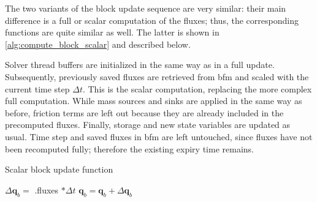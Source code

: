 
The two variants of the block update sequence are very similar: their main difference is a full or scalar computation of the fluxes; thus, the corresponding functions are quite similar as well. The latter is shown in \autoref{alg:compute_block_scalar} and described below.

Solver thread buffers are initialized in the same way as in a full update. 
Subsequently, previously saved fluxes are retrieved from \gls{bfm} and scaled with the current time step $\Delta t$. This is the scalar computation, replacing the more complex full computation.
While mass sources and sinks are applied in the same way as before, friction terms are left out because they are already included in the precomputed fluxes.
Finally, storage and new state variables are updated as usual.
Time step and saved fluxes in \gls{bfm} are left untouched, since fluxes have not been recomputed fully; therefore the existing expiry time remains.

\begin{algorithm} [ht]
  \caption{Scalar block update function}
  \label{alg:compute_block_scalar}
  \begin{algorithmic}[1]
    \small

      \State {} 
      \State $\Delta \mathbf{q}_b =$ .fluxes $* \Delta t$ 
      \State {}
      \State $\mathbf{q}_b = \mathbf{q}_b + \Delta \mathbf{q}_b$ 
      \State {}
    \EndFunction
  \end{algorithmic}
\end{algorithm}

\FloatBarrier

